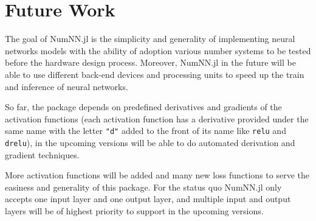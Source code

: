 \section{Future Work}

The goal of NumNN.jl is the simplicity and generality of implementing neural networks models with the ability of adoption various number systems to be tested before the hardware design process. Moreover, NumNN.jl in the future will be able to use different back-end devices and processing units to speed up the train and inference of neural networks. 

So far, the package depends on predefined derivatives and gradients of the activation functions (each activation function has a derivative provided under the same name with the letter \texttt{"d"} added to the front of its name like \texttt{relu} and \texttt{drelu}), in the upcoming versions will be able to do automated derivation and gradient techniques.

More activation functions will be added and many new loss functions to serve the easiness and generality of this package. For  the status quo NumNN.jl only accepts one input layer and one output layer, and multiple input and output layers will be of highest priority to support in the upcoming versions.